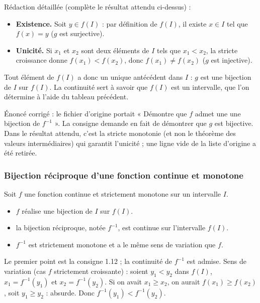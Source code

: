\begin{corrigeprof}
Rédaction détaillée (complète le résultat attendu ci-dessus) :
\begin{itemize}
	\item \textbf{Existence.} Soit $y\in f(I)$ : par définition de $f(I)$, il existe $x\in I$ tel que $f(x)=y$ ($g$ est surjective).
	\item \textbf{Unicité.} Si $x_1$ et $x_2$ sont deux éléments de $I$ tels que $x_1<x_2$, la stricte croissance donne $f(x_1)<f(x_2)$, donc $f(x_1)\neq f(x_2)$ ($g$ est injective).
\end{itemize}
Tout élément de $f(I)$ a donc un unique antécédent dans $I$ : $g$ est une bijection de $I$ sur $f(I)$. La continuité sert à savoir que $f(I)$ est un intervalle, que l'on détermine à l'aide du tableau précédent.
\end{corrigeprof}
\begin{noteprof}
Énoncé corrigé : le fichier d'origine portait « Démontre que $f$ admet une une bijection de $f^{-1}$ ». La consigne demande en fait de démontrer que $g$ est bijective. Dans le résultat attendu, c'est la stricte monotonie (et non le théorème des valeurs intermédiaires) qui garantit l'unicité ; une ligne vide de la liste d'origine a été retirée.
\end{noteprof}
\else
{}
\fi
\ifenseignant %
\subsubsection{Bijection réciproque d'une fonction continue et monotone}
\begin{propriete}
	Soit $f$ une fonction continue et strictement monotone sur un intervalle $I$.
	\begin{itemize}
		\item $f$ réalise une bijection de $I$ sur $f(I)$.
		\item la bijection réciproque, notée $f^{-1}$, est continue sur l'intervalle $f(I)$.
		\item $f^{-1}$ est strictement monotone et a le même sens de variation que $f$.
	\end{itemize}
\end{propriete}
\begin{preuve}
Le premier point est la consigne 1.12 ; la continuité de $f^{-1}$ est admise. Sens de variation (cas $f$ strictement croissante) : soient $y_1<y_2$ dans $f(I)$, $x_1=f^{-1}(y_1)$ et $x_2=f^{-1}(y_2)$. Si on avait $x_1\geq x_2$, on aurait $f(x_1)\geq f(x_2)$, soit $y_1\geq y_2$ : absurde. Donc $f^{-1}(y_1)<f^{-1}(y_2)$.
\end{preuve}

